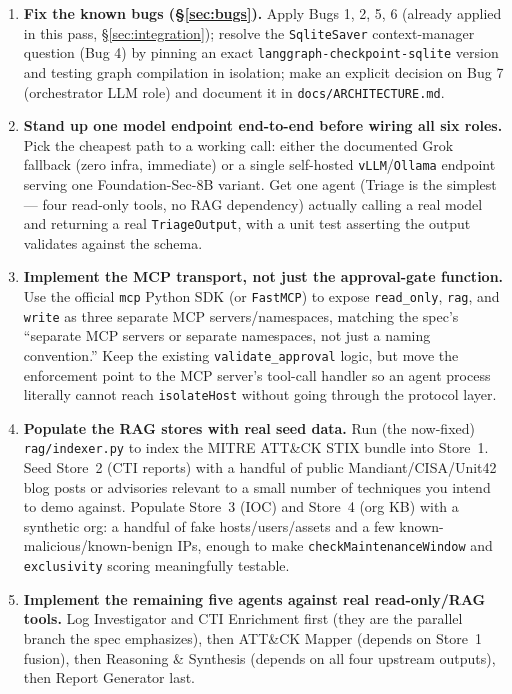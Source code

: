 \documentclass[11pt]{article}
\begin{document}
\begin{enumerate}[label=\textbf{Phase \arabic*:}, leftmargin=2.2cm, itemsep=0.6em]

\item \textbf{Fix the known bugs (\S\ref{sec:bugs}).} Apply Bugs 1, 2, 5, 6 (already applied in this pass, \S\ref{sec:integration}); resolve the \texttt{SqliteSaver} context-manager question (Bug 4) by pinning an exact \texttt{langgraph-checkpoint-sqlite} version and testing graph compilation in isolation; make an explicit decision on Bug 7 (orchestrator LLM role) and document it in \texttt{docs/ARCHITECTURE.md}.

\item \textbf{Stand up one model endpoint end-to-end before wiring all six roles.} Pick the cheapest path to a working call: either the documented Grok fallback (zero infra, immediate) or a single self-hosted \texttt{vLLM}/\texttt{Ollama} endpoint serving one Foundation-Sec-8B variant. Get one agent (Triage is the simplest --- four read-only tools, no RAG dependency) actually calling a real model and returning a real \texttt{TriageOutput}, with a unit test asserting the output validates against the schema.

\item \textbf{Implement the MCP transport, not just the approval-gate function.} Use the official \texttt{mcp} Python SDK (or \texttt{FastMCP}) to expose \texttt{read\_only}, \texttt{rag}, and \texttt{write} as three separate MCP servers/namespaces, matching the spec's ``separate MCP servers or separate namespaces, not just a naming convention.'' Keep the existing \texttt{validate\_approval} logic, but move the enforcement point to the MCP server's tool-call handler so an agent process literally cannot reach \texttt{isolateHost} without going through the protocol layer.

\item \textbf{Populate the RAG stores with real seed data.} Run (the now-fixed) \texttt{rag/indexer.py} to index the MITRE ATT\&CK STIX bundle into Store~1. Seed Store~2 (CTI reports) with a handful of public Mandiant/CISA/Unit42 blog posts or advisories relevant to a small number of techniques you intend to demo against. Populate Store~3 (IOC) and Store~4 (org KB) with a synthetic org: a handful of fake hosts/users/assets and a few known-malicious/known-benign IPs, enough to make \texttt{checkMaintenanceWindow} and \texttt{exclusivity} scoring meaningfully testable.

\item \textbf{Implement the remaining five agents against real read-only/RAG tools.} Log Investigator and CTI Enrichment first (they are the parallel branch the spec emphasizes), then ATT\&CK Mapper (depends on Store~1 fusion), then Reasoning \& Synthesis (depends on all four upstream outputs), then Report Generator last.


\end{enumerate}
\end{document}
